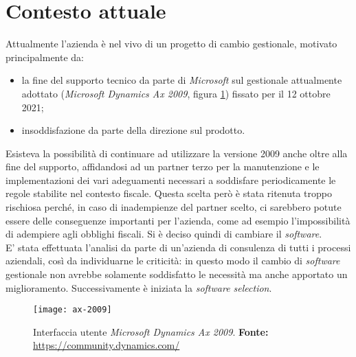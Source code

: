 \section{Contesto attuale}

Attualmente l'azienda è nel vivo di un progetto di cambio gestionale, motivato principalmente da:
\begin{itemize}
	\item la fine del supporto tecnico da parte di \textit{Microsoft} sul gestionale attualmente adottato (\textit{Microsoft Dynamics Ax 2009}, figura \ref{fig:ax-2009}) fissato per il 12 ottobre 2021;
	\item insoddisfazione da parte della direzione sul prodotto.
\end{itemize}
Esisteva la possibilità di continuare ad utilizzare la versione 2009 anche oltre alla fine del supporto, affidandosi ad un partner terzo per la manutenzione e le implementazioni dei vari adeguamenti necessari a soddisfare periodicamente le regole stabilite nel contesto fiscale. Questa scelta però è stata ritenuta troppo rischiosa perché, in caso di inadempienze del partner scelto, ci sarebbero potute essere delle conseguenze importanti per l'azienda, come ad esempio l'impossibilità di adempiere agli obblighi fiscali.
Si è deciso quindi di cambiare il \textit{software}.\\
E' stata effettuata l'analisi da parte di un'azienda di consulenza di tutti i processi aziendali, così da individuarne le criticità: in questo modo il cambio di \textit{software} gestionale non avrebbe solamente soddisfatto le necessità ma anche apportato un miglioramento. Successivamente è iniziata la \textit{software selection}.

\vspace{10pt}
\begin{figure}[htbp]
	\begin{center}
		\texttt{[image: ax-2009]}
		\caption{Interfaccia utente \textit{Microsoft Dynamics Ax 2009}. \newline \textbf{Fonte: }\url{https://community.dynamics.com/}}
		\label{fig:ax-2009}
	\end{center}
\end{figure}
\vspace{10pt}

